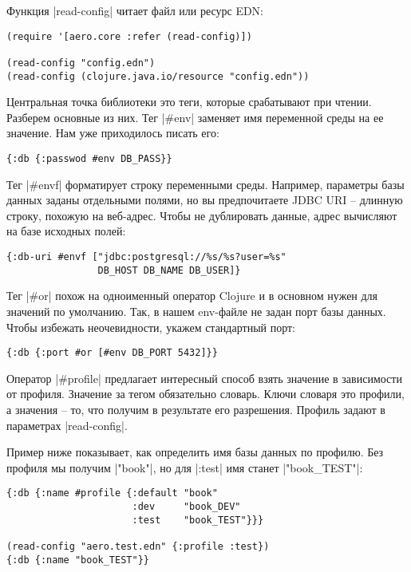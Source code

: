 Функция \spverb|read-config| читает файл или ресурс EDN:

\begin{verbatim}
(require '[aero.core :refer (read-config)])

(read-config "config.edn")
(read-config (clojure.java.io/resource "config.edn"))
\end{verbatim}

Центральная точка библиотеки это теги, которые срабатывают при чтении. Разберем
основные из них. Тег \spverb|#env| заменяет имя переменной среды на ее значение. Нам
уже приходилось писать его:

\begin{verbatim}
{:db {:passwod #env DB_PASS}}
\end{verbatim}

Тег \spverb|#envf| форматирует строку переменными среды. Например, параметры базы
данных заданы отдельными полями, но вы предпочитаете JDBC URI -- длинную строку,
похожую на веб-адрес. Чтобы не дублировать данные, адрес вычисляют на базе
исходных полей:

\begin{verbatim}
{:db-uri #envf ["jdbc:postgresql://%s/%s?user=%s"
                DB_HOST DB_NAME DB_USER]}
\end{verbatim}

Тег \spverb|#or| похож на одноименный оператор Clojure и в основном нужен для значений
по умолчанию. Так, в нашем env-файле не задан порт базы данных. Чтобы избежать
неочевидности, укажем стандартный порт:

\begin{verbatim}
{:db {:port #or [#env DB_PORT 5432]}}
\end{verbatim}

Оператор \spverb|#profile| предлагает интересный способ взять значение в зависимости от
профиля. Значение за тегом обязательно словарь. Ключи словаря это профили, а
значения -- то, что получим в результате его разрешения. Профиль задают в
параметрах \spverb|read-config|.

Пример ниже показывает, как определить имя базы данных по профилю. Без профиля
мы получим \spverb|"book"|, но для \spverb|:test| имя станет \spverb|"book_TEST"|:

\begin{verbatim}
{:db {:name #profile {:default "book"
                      :dev     "book_DEV"
                      :test    "book_TEST"}}}

(read-config "aero.test.edn" {:profile :test})
{:db {:name "book_TEST"}}
\end{verbatim}

